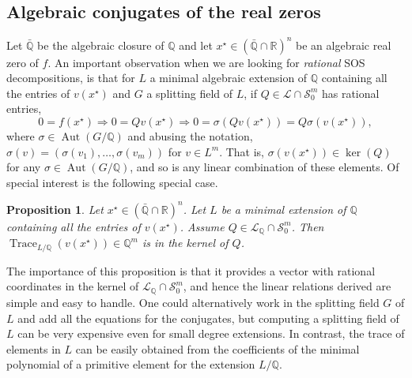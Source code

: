 \documentclass{amsart}
\newtheorem{prop}[theorem]{Proposition}
\theoremstyle{definition}
\theoremstyle{remark}
\numberwithin{equation}{section}
\DeclareMathOperator{\Aut}{Aut}
\DeclareMathOperator{\trace}{Trace}
\newcommand{\Sym}{{\mathcal S}}
\newcommand{\eLL}{{\mathcal L}}
\newcommand{\Q}{{\mathbb Q}}
\newcommand{\R}{{\mathbb R}}
\begin{document}
\subsection{Algebraic conjugates of the real zeros}
Let $\bar\Q$ be the algebraic closure of $\Q$ and let $x^\star \in (\bar\Q \cap \R)^n$ be an algebraic real zero of $f$. An important observation when we are looking for \emph{rational} SOS decompositions, is that for $L$ a minimal algebraic extension of $\Q$ containing all the entries of $v(x^\star)$ and $G$ a splitting field of $L$, if $Q \in \eLL \cap \Sym_0^m$ has rational entries,
\[
0 = f(x^\star) \Rightarrow 0 = Q v(x^\star) \Rightarrow 0 = \sigma(Q v(x^\star)) = Q  \sigma(v(x^\star)),
\]
where $\sigma \in \Aut(G/\Q)$ and abusing the notation, $\sigma(v) = (\sigma(v_1), \dots, \sigma(v_m))$ for $v \in L^m$. That is, $\sigma(v(x^\star)) \in \ker(Q)$ for any $\sigma \in \Aut(G/\Q)$, and so is any linear combination of these elements.
Of special interest is the following special case.

\begin{prop}
Let $x^\star \in (\bar\Q \cap \R)^n$. Let $L$ be a minimal extension of $\Q$ containing all the entries of $v(x^\star)$.
Assume $Q \in \eLL_\Q \cap \Sym_0^m$. Then $\trace_{L/\Q}(v(x^\star)) \in \Q^m$ is in the kernel of $Q$.
\end{prop}

The importance of this proposition is that it provides a vector with rational coordinates in the kernel of $\eLL_\Q \cap \Sym_0^m$, and hence the linear relations derived are simple and easy to handle. One could alternatively work in the splitting field $G$ of $L$ and add all the equations for the conjugates, but computing a splitting field of $L$ can be very expensive even for small degree extensions. In contrast, the trace of elements in $L$ can be easily obtained from the coefficients of the minimal polynomial of a primitive element for the extension $L / \Q$.
\end{document}
